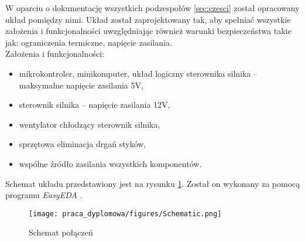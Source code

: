 W oparciu o dokumentację wszystkich podzespołów \ref{sec:czesci} został opracowany układ pomiędzy nimi. Układ został zaprojektowany tak, aby spełniać wszystkie założenia i funkcjonalności uwzględniając również warunki bezpieczeństwa takie jak: ograniczenia termiczne, napięcie zasilania.\\
Założenia i funkcjonalności:
\begin{itemize}
    \item mikrokontroler, minikomputer, układ logiczny sterownika silnika -- maksymalne napięcie zasilania 5V,
    \item sterownik silnika -- napięcie zasilania 12V,
    \item wentylator chłodzący sterownik silnika,
    \item sprzętowa eliminacja drgań styków,
    \item wspólne źródło zasilania wszystkich komponentów.
\end{itemize}
Schemat układu przedstawiony jest na rysunku \ref{fig:schemat}. Został on wykonany za pomocą programu \textit{EasyEDA} \cite{easyeda}. 


\begin{figure}
    \centering
    \texttt{[image: praca\_dyplomowa/figures/Schematic.png]}
    \caption{Schemat połączeń}
    \label{fig:schemat}
\end{figure}